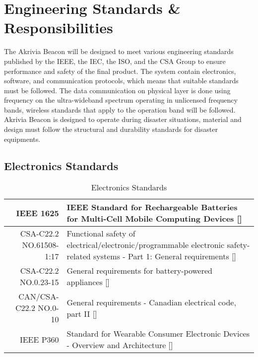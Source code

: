 %

\setcounter{section}{3}
\section{Engineering Standards \& Responsibilities}
\bigskip
The Akrivia Beacon will be designed to meet various engineering standards published by the IEEE, the IEC, the ISO, and the CSA Group to ensure performance and safety of the final product. The system contain electronics, software, and communication protocols, which means that suitable standards must be followed. The data communication on physical layer is done using frequency on the ultra-wideband spectrum operating in unlicensed frequency bands, wireless standards that apply to the operation band will be followed. Akrivia Beacon is designed to operate during disaster situations, material and design must follow the structural and durability standards for disaster equipments.  


\subsection{Electronics Standards}
\bgroup
\def\arraystretch{1.5}
\begin{table}[H]
\centering
\begin{tabular}{ |p{3cm} p{11cm} | }
\hline
\multicolumn{1}{|r|}{IEEE 1625} & IEEE Standard for Rechargeable Batteries for Multi-Cell Mobile Computing Devices []\\ 
\hline
\multicolumn{1}{|r|}{CSA-C22.2 NO.61508-1:17} & Functional safety of electrical/electronic/programmable electronic safety-related systems - Part 1: General requirements []\\ 
\hline
\multicolumn{1}{|r|}{CSA-C22.2 NO.0.23-15} & General requirements for battery-powered appliances []\\  
\hline
\multicolumn{1}{|r|}{CAN/CSA-C22.2 NO.0-10} & General requirements - Canadian electrical code, part II []\\ 
\hline
\multicolumn{1}{|r|}{IEEE P360} & Standard for Wearable Consumer Electronic Devices - Overview and Architecture [] \\  
\hline
\end{tabular}
\caption{Electronics Standards}
\end{table}	
\medskip


